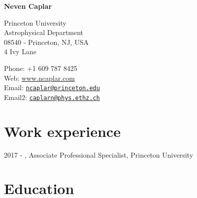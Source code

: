 \documentclass[11pt,letterpaper]{article}
\def\name{\textbf{Neven Caplar}}
\renewenvironment{itemize}{
  \begin{list}{}{
    \setlength{\leftmargin}{1.5em}
    \setlength{\itemsep}{0.15em}
    \setlength{\parskip}{0pt}
    \setlength{\parsep}{0.25em}
  }
}{
  \end{list}
}
\begin{document}
{\huge \name}


\bigskip

\begin{minipage}[t]{0.495\textwidth}
  Princeton University\\
  Astrophysical Department \\
  08540 - Princeton, NJ, USA	 \\
	4 Ivy Lane
\end{minipage}
\begin{minipage}[t]{0.495\textwidth}
  Phone: +1 609 787 8425 \\
  Web: \href{ www.ncaplar.com}{www.ncaplar.com} \\
  Email: \href{ncaplar@princeton.edu}{\nolinkurl{ncaplar@princeton.edu}} \\
  Email2: \href{caplarn@phys.ethz.ch}{\nolinkurl{caplarn@phys.ethz.ch}} \\

\end{minipage}


\section*{Work experience}

\begin{itemize}
  \item 2017 - , Associate Professional Specialist, Princeton University
\end{itemize}  


\section*{Education}
\end{document}
